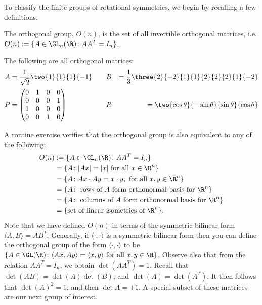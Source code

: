 To classify the finite groups of rotational symmetries, we begin by recalling a few definitions.

\begin{dfn}
The orthogonal group, $O(n)$, is the set of all invertible orthogonal matrices, i.e. $O(n):= \{ A \in \GL_n(\R) \colon AA^T= I_n\}$.
\end{dfn}


\begin{ex}
The following are all orthogonal matrices:
	\[
	\begin{aligned}
	A&= \dfrac{1}{\sqrt{2}} \two{1}{1}{1}{-1} && && B&= \dfrac{1}{3} \three{2}{-2}{1}{1}{2}{2}{2}{1}{-2} \\
	P&= \begin{pmatrix} 0 & 1 & 0 & 0 \\ 0 & 0 & 0 & 1 \\ 1 & 0 & 0 & 0 \\ 0 & 0 & 1 & 0 \end{pmatrix} && && R&= \two{\cos\theta}{-\sin\theta}{\sin\theta}{\cos\theta}
	\end{aligned}
	\] \xqed
\end{ex}


A routine exercise verifies that the orthogonal group is also equivalent to any of the following:
	\[
	\begin{split}
	O(n)&:= \{ A \in \GL_n(\R) \colon AA^T= I_n\} \\
	&=\{ A \colon |Ax|=|x| \text{ for all }x \in \R^n\} \\
	&= \{A \colon Ax \cdot Ay = x \cdot y, \text{ for all }x,y \in \R^n\} \\
	&= \{ A \colon \text{ rows of }A\text{ form orthonormal basis for }\R^n\} \\
	&= \{ A \colon \text{ columns of }A\text{ form orthonormal basis for }\R^n\} \\
	&=\{ \text{set of linear isometries of }\R^n\}.
	\end{split}
	\]
Note that we have defined $O(n)$ in terms of the symmetric bilinear form $\langle A, B \rangle = AB^T$. Generally, if $\langle \cdot,\cdot \rangle$ is a symmetric bilinear form then you can define the orthogonal group of the form $\langle \cdot, \cdot \rangle$ to be $\{ A \in \GL(\R) \colon \langle Ax , Ay \rangle=\langle x, y \rangle \text{ for all }x,y \in \R\}$. Observe also that from the relation $AA^T=I_n$, we obtain $\det(AA^T)=1$. Recall that $\det(AB)=\det(A)\det(B)$, and $\det(A)=\det(A^T)$. It then follows that $\det(A)^2=1$, and then $\det A = \pm 1$.  A special subset of these matrices are our next group of interest. 


